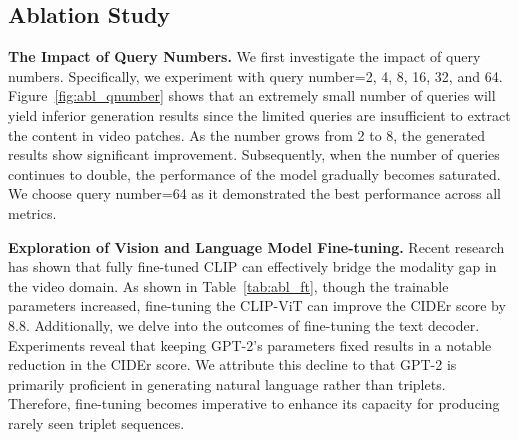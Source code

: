 \documentclass[letterpaper]{article}
\begin{document}
\subsection{Ablation Study}
\noindent \textbf{The Impact of Query Numbers. }
We first investigate the impact of query numbers.
Specifically, we experiment with query number=2, 4, 8, 16, 32, and 64.
Figure~\ref{fig:abl_qnumber} shows that an extremely small number of queries will yield inferior generation results since the limited queries are insufficient to extract the content in video patches.
As the number grows from 2 to 8, the generated results show significant improvement.
Subsequently, when the number of queries continues to double, the performance of the model gradually becomes saturated. We choose query number=64 as it demonstrated the best performance across all metrics.

\noindent \textbf{Exploration of Vision and Language Model Fine-tuning.}
Recent research~\cite{Rasheed2023vificlip} has shown that fully fine-tuned CLIP can effectively bridge the modality gap in the video domain.
As shown in Table~\ref{tab:abl_ft}, though the trainable parameters increased, fine-tuning the CLIP-ViT can improve the CIDEr score by 8.8.
Additionally, we delve into the outcomes of fine-tuning the text decoder. Experiments reveal that keeping GPT-2's parameters fixed results in a notable reduction in the CIDEr score. We attribute this decline to that GPT-2 is primarily proficient in generating natural language rather than triplets. Therefore, fine-tuning becomes imperative to enhance its capacity for producing rarely seen triplet sequences.
\end{document}
